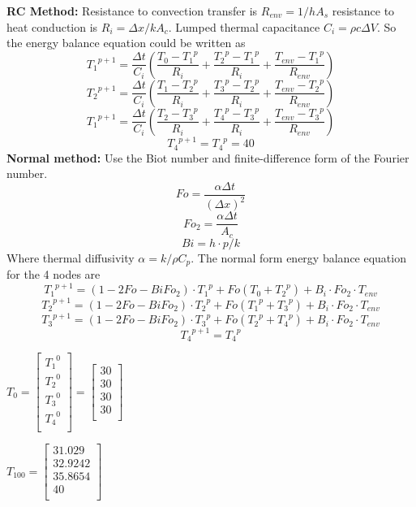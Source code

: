 \begin{solution}
\textbf{RC Method:} 
Resistance to convection  transfer is $R_{env}=1/hA_s$ resistance to heat conduction is
$R_i=\Delta x/kA_c$. Lumped thermal capacitance $C_i=\rho c\Delta V$.
So the energy balance equation could be written as
$$
{T_1}^{p+1}=\frac{\Delta t}{C_i}
\left(
\frac{{T_0}-{T_1}^p}{R_i}+
\frac{{T_2}^p-{T_1}^p}{R_i}+
\frac{T_{env}-{T_1}^p}{R_{env}}
\right)
$$
$$
{T_2}^{p+1}=\frac{\Delta t}{C_i}
\left(
\frac{{T_1}-{T_2}^p}{R_i}+
\frac{{T_3}^p-{T_2}^p}{R_i}+
\frac{T_{env}-{T_2}^p}{R_{env}}
\right)
$$
$$
{T_1}^{p+1}=\frac{\Delta t}{C_i}
\left(
\frac{{T_2}-{T_3}^p}{R_i}+
\frac{{T_4}^p-{T_3}^p}{R_i}+
\frac{T_{env}-{T_3}^p}{R_{env}}
\right)
$$
$${T_4}^{p+1}={T_4}^p=40$$
\textbf{Normal method:}
Use the Biot number and finite-difference form of the Fourier number.
$$Fo=\frac{\alpha\Delta t}{(\Delta x)^2}$$
$${Fo}_2=\frac{\alpha\Delta t}{A_c}$$
$$Bi=h\cdot p/k $$
Where thermal diffusivity $\alpha=k/\rho C_p$. The normal form energy balance
equation for the 4 nodes are
$$
{T_1}^{p+1}=(1-2Fo-Bi{Fo}_2)\cdot {T_1}^p+
Fo(T_0+{T_2}^p)+B_i\cdot {Fo}_2\cdot T_{env}
$$
$$
{T_2}^{p+1}=(1-2Fo-Bi{Fo}_2)\cdot {T_2}^p+
Fo({T_1}^p+{T_3}^p)+B_i\cdot {Fo}_2\cdot T_{env}
$$
$$
{T_3}^{p+1}=(1-2Fo-Bi{Fo}_2)\cdot {T_3}^p+
Fo({T_2}^p+{T_4}^p)+B_i\cdot {Fo}_2\cdot T_{env}
$$
$${T_4}^{p+1}={T_4}^p$$

$T_0= 
\begin{bmatrix}
{T_1}^0\\
{T_2}^0\\
{T_3}^0\\
{T_4}^0\\
\end{bmatrix}
=
\begin{bmatrix}
30\\
30\\
30\\
30\\
\end{bmatrix}
$

$T_{100}=
\begin{bmatrix}
31.029\\
32.9242\\
35.8654\\
40\\
\end{bmatrix}
$
\end{solution}


